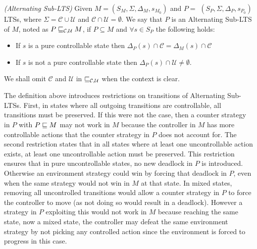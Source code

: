 \begin{definition}\label{def:nonreal-legalEnvironment}\emph{(Alternating Sub-LTS)}
Given $M = (S_M, \Sigma, \Delta_M, s_{M_0})$ and
 $P =$ $(S_P,\Sigma,\Delta_P,s_{P_0})$ LTSs, 
where $\Sigma =\mathcal{C}\cup \mathcal{U}$ and $\mathcal{C}\cap
\mathcal{U}=\emptyset$. We say that $P$ is an Alternating
 Sub-LTS of $M$, noted as $P \sqsubseteq_{\mathcal{C},\mathcal{U}} M$, if  $P \subseteq M$  and $\forall s \in S_{P}$ the following holds:
 \begin{itemize}
\item If $s$ is a pure controllable state then $\Delta_{P}(s) \cap \mathcal{C} = \Delta_{M}(s) \cap \mathcal{C} $
\item If $s$ is not a pure controllable state then  
$\Delta_{P}(s) \cap \mathcal{U} \neq \emptyset$.
 \end{itemize}
 
We shall omit $\mathcal{C}$ and $\mathcal{U}$ in $\sqsubseteq_{\mathcal{C},\mathcal{U}}$ when the context is clear. 
 \end{definition}

The definition above introduces  restrictions on transitions of Alternating Sub-LTSs. 
First, in states where all outgoing transitions are controllable, all transitions must be preserved. 
If this were not the case, then a counter strategy in $P$ with $P \sqsubseteq M$ may not work in $M$ because the controller in $M$ has more controllable actions that the counter strategy in $P$ does not account for. 
The second restriction states that in all states where at least one uncontrollable action exists, at least one uncontrollable action must be preserved. This restriction ensures that in pure uncontrollable states, no new deadlock in $P$ is introduced. Otherwise an environment strategy could win by forcing that deadlock in $P$, even when the same strategy would not win in $M$ at that state. In mixed states, removing all uncontrolled transitions would allow a counter strategy in $P$ to force the controller to move (as not doing so would result in a deadlock). However a strategy in $P$ exploiting this would not work in $M$ because reaching the same state, now a mixed state, the controller may defeat the same environment strategy by not picking any controlled action since the environment is forced to progress in this case. 

